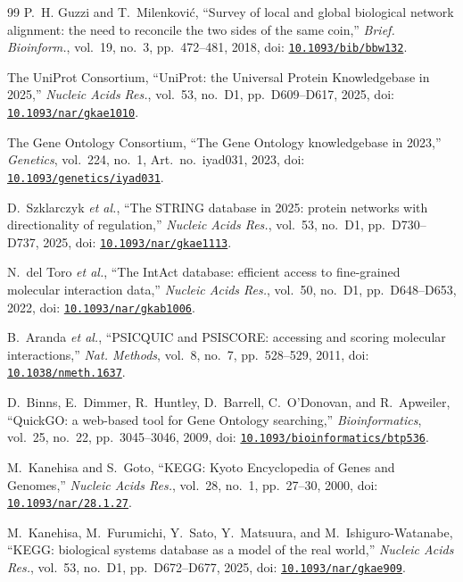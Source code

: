 \documentclass[conference]{IEEEtran}
\begin{document}
\begin{thebibliography}{99}
P.~H. Guzzi and T.~Milenkovi\'{c}, ``Survey of local and global biological network alignment: the
need to reconcile the two sides of the same coin,'' \emph{Brief. Bioinform.}, vol.~19, no.~3,
pp.~472--481, 2018,
doi: \href{https://doi.org/10.1093/bib/bbw132}{\nolinkurl{10.1093/bib/bbw132}}.

The UniProt Consortium, ``UniProt: the Universal Protein Knowledgebase in 2025,''
\emph{Nucleic Acids Res.}, vol.~53, no.~D1, pp.~D609--D617, 2025,
doi: \href{https://doi.org/10.1093/nar/gkae1010}{\nolinkurl{10.1093/nar/gkae1010}}.

The Gene Ontology Consortium, ``The Gene Ontology knowledgebase in 2023,'' \emph{Genetics},
vol.~224, no.~1, Art.~no.~iyad031, 2023,
doi: \href{https://doi.org/10.1093/genetics/iyad031}{\nolinkurl{10.1093/genetics/iyad031}}.

D.~Szklarczyk \emph{et al.}, ``The STRING database in 2025: protein networks with directionality
of regulation,'' \emph{Nucleic Acids Res.}, vol.~53, no.~D1, pp.~D730--D737, 2025,
doi: \href{https://doi.org/10.1093/nar/gkae1113}{\nolinkurl{10.1093/nar/gkae1113}}.

N.~del Toro \emph{et al.}, ``The IntAct database: efficient access to fine-grained molecular
interaction data,'' \emph{Nucleic Acids Res.}, vol.~50, no.~D1, pp.~D648--D653, 2022,
doi: \href{https://doi.org/10.1093/nar/gkab1006}{\nolinkurl{10.1093/nar/gkab1006}}.

B.~Aranda \emph{et al.}, ``PSICQUIC and PSISCORE: accessing and scoring molecular
interactions,'' \emph{Nat. Methods}, vol.~8, no.~7, pp.~528--529, 2011,
doi: \href{https://doi.org/10.1038/nmeth.1637}{\nolinkurl{10.1038/nmeth.1637}}.

D.~Binns, E.~Dimmer, R.~Huntley, D.~Barrell, C.~O'Donovan, and R.~Apweiler, ``QuickGO: a
web-based tool for Gene Ontology searching,'' \emph{Bioinformatics}, vol.~25, no.~22,
pp.~3045--3046, 2009,
doi: \href{https://doi.org/10.1093/bioinformatics/btp536}{\nolinkurl{10.1093/bioinformatics/btp536}}.

M.~Kanehisa and S.~Goto, ``KEGG: Kyoto Encyclopedia of Genes and Genomes,'' \emph{Nucleic Acids
Res.}, vol.~28, no.~1, pp.~27--30, 2000,
doi: \href{https://doi.org/10.1093/nar/28.1.27}{\nolinkurl{10.1093/nar/28.1.27}}.

M.~Kanehisa, M.~Furumichi, Y.~Sato, Y.~Matsuura, and M.~Ishiguro-Watanabe, ``KEGG: biological
systems database as a model of the real world,'' \emph{Nucleic Acids Res.}, vol.~53, no.~D1,
pp.~D672--D677, 2025,
doi: \href{https://doi.org/10.1093/nar/gkae909}{\nolinkurl{10.1093/nar/gkae909}}.


\end{thebibliography}
\end{document}
